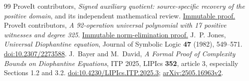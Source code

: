 \documentclass[11pt]{article}
\theoremstyle{remark}\newtheorem{remark}[theorem]{Remark}
\begin{document}
\begin{thebibliography}{99}
 ProveIt contributors, \emph{Signed auxiliary quotient: source-specific recovery of the positive domain}, and its independent mathematical review. \href{https://github.com/VladimirReshetnikov/ProveIt/blob/cdd582bec13f908df3711fa9e05d1ddac368a5db/Computability/HilbertTenthProblem/Papers/research-wip/native-stream-queue/complete84_signed_quotient_soundness_scout.md}{Immutable proof.}
 ProveIt contributors, \emph{A 92-operation universal polynomial with 17 positive witnesses and degree 325}. \href{https://github.com/VladimirReshetnikov/ProveIt/blob/cdd582bec13f908df3711fa9e05d1ddac368a5db/Computability/HilbertTenthProblem/Papers/research-wip/native-stream-queue/complete92_norm_unit_guard.md}{Immutable norm-elimination proof.}
 J.~P. Jones, \emph{Universal Diophantine equation}, Journal of Symbolic Logic \textbf{47} (1982), 549--571. \href{https://doi.org/10.2307/2273588}{doi:10.2307/2273588}.
 J.~Bayer and M.~David, \emph{A Formal Proof of Complexity Bounds on Diophantine Equations}, ITP 2025, LIPIcs \textbf{352}, article 3, especially Sections 1.2 and 3.2. \href{https://doi.org/10.4230/LIPIcs.ITP.2025.3}{doi:10.4230/LIPIcs.ITP.2025.3}; \href{https://arxiv.org/html/2505.16963v2}{arXiv:2505.16963v2}.
\end{thebibliography}
\end{document}
